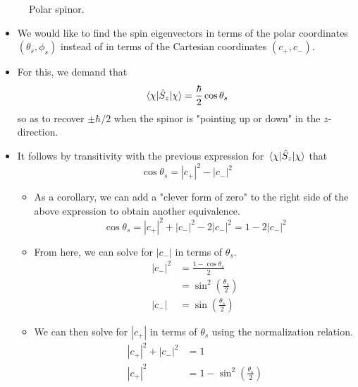 \documentclass[../notes.tex]{subfiles}
\begin{document}
\begin{itemize}
\begin{figure}[h!]
        \caption{Polar spinor.}
        \label{fig:polarSpinor}
    \end{figure}
    \begin{itemize}
        \item We would like to find the spin eigenvectors in terms of the polar coordinates $(\theta_s,\phi_s)$ instead of in terms of the Cartesian coordinates $(c_+,c_-)$.
        \item For this, we demand that
        \begin{equation*}
            \ev{\hat{S}_z}{\chi} = \frac{\hbar}{2}\cos\theta_s
        \end{equation*}
        so as to recover $\pm\hbar/2$ when the spinor is "pointing up or down" in the $z$-direction.
        \item It follows by transitivity with the previous expression for $\ev{\hat{S}_z}{\chi}$ that
        \begin{equation*}
            \cos\theta_s = |c_+|^2-|c_-|^2
        \end{equation*}
        \begin{itemize}
            \item As a corollary, we can add a "clever form of zero" to the right side of the above expression to obtain another equivalence.
            \begin{equation*}
                \cos\theta_s = |c_+|^2+|c_-|^2-2|c_-|^2
                = 1-2|c_-|^2
            \end{equation*}
            \item From here, we can solve for $|c_-|$ in terms of $\theta_s$.
            \begin{align*}
                |c_-|^2 &= \frac{1-\cos\theta_s}{2}\\
                &= \sin^2\left( \frac{\theta_s}{2} \right)\\
                |c_-| &= \sin(\frac{\theta_s}{2})
            \end{align*}
            \item We can then solve for $|c_+|$ in terms of $\theta_s$ using the normalization relation.
            \begin{align*}
                |c_+|^2+|c_-|^2 &= 1\\
                |c_+|^2 &= 1-\sin^2\left( \frac{\theta_s}{2} \right)\\

\end{align*}
\end{itemize}
\end{itemize}
\end{itemize}
\end{document}
